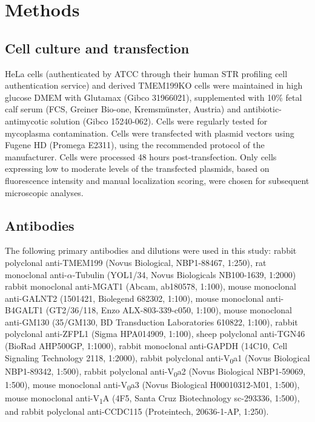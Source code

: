 \clearpage

\section{Methods}

\subsection{Cell culture and transfection}

HeLa cells (authenticated by ATCC through their human STR profiling cell authentication service) and derived TMEM199KO cells were maintained in high glucose DMEM with Glutamax (Gibco 31966021), supplemented with 10\% fetal calf serum (FCS, Greiner Bio-one, Kremsmünster, Austria) and antibiotic-antimycotic solution (Gibco 15240-062). Cells were regularly tested for mycoplasma contamination. Cells were transfected with plasmid vectors using Fugene HD (Promega E2311), using the recommended protocol of the manufacturer. Cells were processed 48 hours post-transfection. Only cells expressing low to moderate levels of the transfected plasmids, based on fluorescence intensity and manual localization scoring, were chosen for subsequent microscopic analyses.

\subsection{Antibodies}

The following primary antibodies and dilutions were used in this study: rabbit polyclonal anti-TMEM199 (Novus Biological, NBP1-88467, 1:250), rat monoclonal anti-$\alpha$-Tubulin (YOL1/34, Novus Biologicals NB100-1639, 1:2000) rabbit monoclonal anti-MGAT1 (Abcam, ab180578, 1:100), mouse monoclonal anti-GALNT2 (1501421, Biolegend 682302, 1:100), mouse monoclonal anti-B4GALT1 (GT2/36/118, Enzo ALX-803-339-c050, 1:100), mouse monoclonal anti-GM130 (35/GM130, BD Transduction Laboratories 610822, 1:100), rabbit polyclonal anti-ZFPL1 (Sigma HPA014909, 1:100), sheep polyclonal anti-TGN46 (BioRad AHP500GP, 1:1000), rabbit monoclonal anti-GAPDH (14C10, Cell Signaling Technology 2118, 1:2000), rabbit polyclonal anti-V\textsubscript{0}a1 (Novus Biological NBP1-89342, 1:500), rabbit polyclonal anti-V\textsubscript{0}a2 (Novus Biological NBP1-59069, 1:500), mouse monoclonal anti-V\textsubscript{0}a3 (Novus Biological H00010312-M01, 1:500), mouse monoclonal anti-V\textsubscript{1}A (4F5, Santa Cruz Biotechnology sc-293336, 1:500), and rabbit polyclonal anti-CCDC115 (Proteintech, 20636-1-AP, 1:250).

